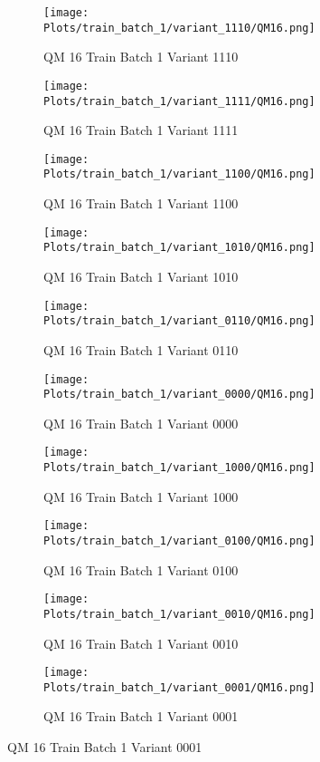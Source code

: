 \documentclass{DissertateFigs}
\begin{document}
\begin{figure}[t!]
    \begin{subfigure}{0.33\textwidth}
    \texttt{[image: Plots/train\_batch\_1/variant\_1110/QM16.png]}
    \caption{QM 16 Train Batch 1 Variant 1110}
    \end{subfigure}
    \begin{subfigure}{0.33\textwidth}
    \texttt{[image: Plots/train\_batch\_1/variant\_1111/QM16.png]}
    \caption{QM 16 Train Batch 1 Variant 1111}
    \end{subfigure}

\medskip

    \begin{subfigure}{0.33\textwidth}
    \texttt{[image: Plots/train\_batch\_1/variant\_1100/QM16.png]}
    \caption{QM 16 Train Batch 1 Variant 1100}
    \end{subfigure}
    \begin{subfigure}{0.33\textwidth}
    \texttt{[image: Plots/train\_batch\_1/variant\_1010/QM16.png]}
    \caption{QM 16 Train Batch 1 Variant 1010}
    \end{subfigure}

\medskip

    \begin{subfigure}{0.33\textwidth}
    \texttt{[image: Plots/train\_batch\_1/variant\_0110/QM16.png]}
    \caption{QM 16 Train Batch 1 Variant 0110}
    \end{subfigure}
    \begin{subfigure}{0.33\textwidth}
    \texttt{[image: Plots/train\_batch\_1/variant\_0000/QM16.png]}
    \caption{QM 16 Train Batch 1 Variant 0000}
    \end{subfigure}

\medskip

    \begin{subfigure}{0.33\textwidth}
    \texttt{[image: Plots/train\_batch\_1/variant\_1000/QM16.png]}
    \caption{QM 16 Train Batch 1 Variant 1000}
    \end{subfigure}
    \begin{subfigure}{0.33\textwidth}
    \texttt{[image: Plots/train\_batch\_1/variant\_0100/QM16.png]}
    \caption{QM 16 Train Batch 1 Variant 0100}
    \end{subfigure}

\medskip

    \begin{subfigure}{0.33\textwidth}
    \texttt{[image: Plots/train\_batch\_1/variant\_0010/QM16.png]}
    \caption{QM 16 Train Batch 1 Variant 0010}
    \end{subfigure}
    \begin{subfigure}{0.33\textwidth}
    \texttt{[image: Plots/train\_batch\_1/variant\_0001/QM16.png]}
    \caption{QM 16 Train Batch 1 Variant 0001}
    \end{subfigure}


\end{figure}
\end{document}
